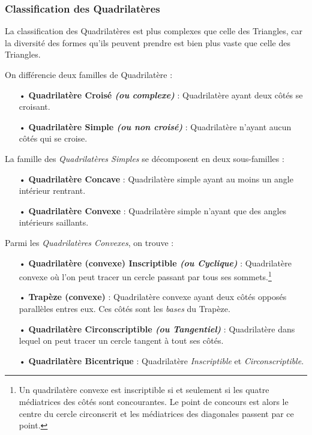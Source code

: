 \documentclass[a4paper, twoside]{article}
\begin{document}
\subsubsection{Classification des Quadrilatères}

La classification des Quadrilatères est plus complexes que celle
des Triangles, car la diversité des formes qu'ils peuvent prendre
est bien plus vaste que celle des Triangles.

\medbreak

On différencie deux familles de Quadrilatère :

\begin{itemize}
	\item[•] \textbf{Quadrilatère Croisé \textit{(ou complexe)}} : Quadrilatère ayant deux côtés se croisant.
	\item[•] \textbf{Quadrilatère Simple \textit{(ou non croisé)}} : Quadrilatère n'ayant aucun côtés qui se croise.
\end{itemize}

\bigbreak

La famille des \emph{Quadrilatères Simples} se décomposent en deux sous-familles :

\begin{itemize}
	\item[•] \textbf{Quadrilatère Concave} : Quadrilatère simple ayant au moins un angle intérieur rentrant.
	\item[•] \textbf{Quadrilatère Convexe} : Quadrilatère simple n'ayant que des angles intérieurs saillants.
\end{itemize}

\bigbreak

Parmi les \emph{Quadrilatères Convexes}, on trouve :

\begin{itemize}
	\item[•] \textbf{Quadrilatère (convexe) Inscriptible \textit{(ou Cyclique)}} : Quadrilatère convexe où l'on peut tracer un cercle passant par tous ses sommets.\footnote{
		      Un quadrilatère convexe est inscriptible
		      si et seulement si les quatre médiatrices des côtés
		      sont concourantes. Le point de concours est alors le centre
		      du cercle circonscrit et les médiatrices des diagonales
		      passent par ce point.}

	\item[•] \textbf{Trapèze (convexe)} : Quadrilatère convexe ayant deux côtés opposés parallèles entres eux. Ces côtés sont les \emph{bases} du Trapèze.
	\item[•] \textbf{Quadrilatère Circonscriptible \textit{(ou Tangentiel)}} : Quadrilatère dans lequel on peut tracer un cercle tangent à tout ses côtés.
	\item[•] \textbf{Quadrilatère Bicentrique} : Quadrilatère \textit{Inscriptible} et \textit{Circonscriptible}.
\end{itemize}
\end{document}
